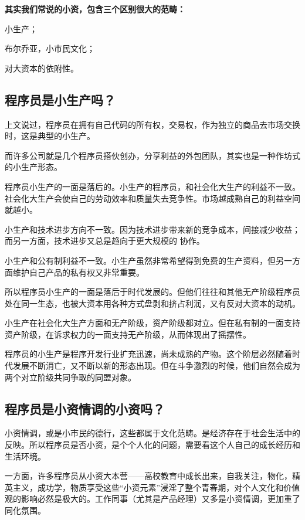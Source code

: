 \documentclass[punct=kaiming, zihao=5, openany, fontset=sikou]{ctexbook}
\begin{document}
{\bfseries 其实我们常说的小资，包含三个区别很大的范畴：
\begin{inparaenum}
  \item 小生产；
  \item 布尔乔亚，小市民文化；
  \item 对大资本的依附性。
\end{inparaenum}}

\subsection{程序员是小生产吗？}
上文说过，程序员在拥有自己代码的所有权，交易权，作为独立的商品去市场交换时，这是典型的小生产。

而许多公司就是几个程序员搭伙创办，分享利益的外包团队，其实也是一种作坊式的小生产形态。

程序员小生产的一面是落后的。小生产的程序员，和社会化大生产的利益不一致。社会化大生产会使自己的劳动效率和质量失去竞争性。市场越成熟自己的利益空间就越小。

小生产和技术进步方向不一致。因为技术进步带来新的竞争成本，间接减少收益；而另一方面，技术进步又总是趋向于更大规模的 协作。

小生产和公有制利益不一致。小生产虽然非常希望得到免费的生产资料，但另一方面维护自己产品的私有权又非常重要。

所以程序员小生产的一面是落后于时代发展的。但他们往往和其他无产阶级程序员处在同一生态，也被大资本用各种方式盘剥和挤占利润，又有反对大资本的动机。

小生产在社会化大生产方面和无产阶级，资产阶级都对立。但在私有制的一面支持资产阶级，在诉求权力的一面支持无产阶级，从而体现出了摇摆性。

程序员的小生产是程序开发行业扩充迅速，尚未成熟的产物。这个阶层必然随着时代发展不断消亡，又不断以新的形态出现。但在斗争激烈的时候，他们自然会成为两个对立阶级共同争取的同盟对象。

\subsection{程序员是小资情调的小资吗？}
小资情调，或是小市民的德行，这些都属于文化范畴。是经济存在于社会生活中的反映。所以程序员是否小资，是个个人化的问题，需要看这个人自己的成长经历和生活环境。

一方面，许多程序员从小资大本营——高校教育中成长出来，自我关注，物化，精英主义，成功学，物质享受这些“小资元素”浸淫了整个青春期，对个人文化和价值观的影响必然是极大的。工作同事（尤其是产品经理）又多是小资情调，更加重了同化氛围。
\end{document}
